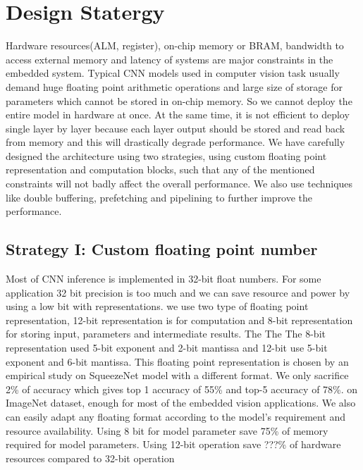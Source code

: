 \documentclass[conference]{IEEEtran}
\begin{document}
\section{Design Statergy}
Hardware resources(ALM, register), on-chip memory or BRAM, bandwidth to access external memory and latency of systems are major constraints in the embedded system. Typical CNN models used in computer vision task usually demand huge floating point arithmetic operations and large size of storage for parameters which cannot be stored in on-chip memory. So we cannot deploy the entire model in hardware at once. At the same time, it is not efficient to deploy single layer by layer because each layer output should be stored and read back from memory and this will drastically degrade performance. We have carefully designed the architecture using two strategies, using custom floating point representation and computation blocks, such that any of the mentioned constraints will not badly affect the overall performance.  We also use techniques like double buffering, prefetching and pipelining to further improve the performance.

\subsection{Strategy I: Custom floating point number
}\label{AA}
Most of CNN inference is implemented in 32-bit float numbers. For some application 32 bit precision is too much and we can save resource and power by using a low bit with representations. we use two type of floating point representation, 12-bit representation is for computation and 8-bit representation for storing input, parameters and intermediate results. The The The 8-bit representation used 5-bit exponent and 2-bit mantissa and 12-bit use 5-bit exponent and 6-bit mantissa. This floating point representation is chosen by an empirical study on SqueezeNet model with a different format. We only sacrifice 2\% of accuracy which gives top 1 accuracy of 55\% and top-5 accuracy of 78\%. on ImageNet dataset, enough for most of the embedded vision applications. We also can easily adapt any floating format according to the model’s requirement and resource availability. Using 8 bit for model parameter save 75\% of memory required for model parameters. Using 12-bit operation save ???\% of hardware resources compared to 32-bit operation
\end{document}
